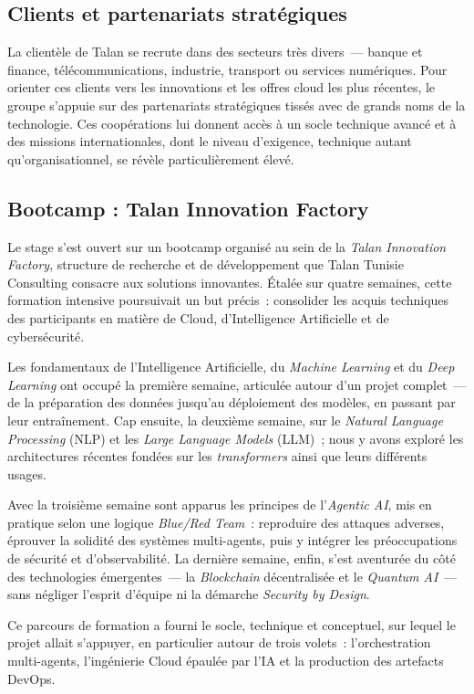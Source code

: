 \subsection{Clients et partenariats stratégiques}
La clientèle de Talan se recrute dans des secteurs très divers~--- banque et finance,
télécommunications, industrie, transport ou services numériques. Pour orienter ces clients
vers les innovations et les offres cloud les plus récentes, le groupe s'appuie sur des
partenariats stratégiques tissés avec de grands noms de la technologie. Ces coopérations lui
donnent accès à un socle technique avancé et à des missions internationales, dont le niveau
d'exigence, technique autant qu'organisationnel, se révèle particulièrement élevé.

\subsection{Bootcamp : Talan Innovation Factory}
Le stage s'est ouvert sur un bootcamp organisé au sein de la \textit{Talan Innovation
Factory}, structure de recherche et de développement que Talan Tunisie Consulting consacre
aux solutions innovantes. Étalée sur quatre semaines, cette formation intensive poursuivait
un but précis~: consolider les acquis techniques des participants en matière de Cloud,
d'Intelligence Artificielle et de cybersécurité.

Les fondamentaux de l'Intelligence Artificielle, du \textit{Machine Learning} et du
\textit{Deep Learning} ont occupé la première semaine, articulée autour d'un projet
complet~--- de la préparation des données jusqu'au déploiement des modèles, en passant par
leur entraînement. Cap ensuite, la deuxième semaine, sur le \textit{Natural Language
Processing} (NLP) et les \textit{Large Language Models} (LLM)~; nous y avons exploré les
architectures récentes fondées sur les \textit{transformers} ainsi que leurs différents
usages.

Avec la troisième semaine sont apparus les principes de l'\textit{Agentic AI}, mis en
pratique selon une logique \textit{Blue/Red Team}~: reproduire des attaques adverses,
éprouver la solidité des systèmes multi-agents, puis y intégrer les préoccupations de
sécurité et d'observabilité. La dernière semaine, enfin, s'est aventurée du côté des
technologies émergentes~--- la \textit{Blockchain} décentralisée et le \textit{Quantum
AI}~--- sans négliger l'esprit d'équipe ni la démarche \textit{Security by Design}.

Ce parcours de formation a fourni le socle, technique et conceptuel, sur lequel le projet
allait s'appuyer, en particulier autour de trois volets~: l'orchestration multi-agents,
l'ingénierie Cloud épaulée par l'IA et la production des artefacts DevOps.

